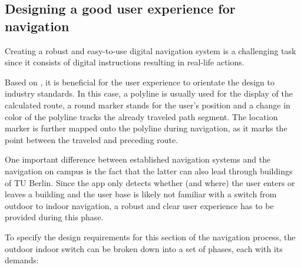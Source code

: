 \subsection{Designing a good user experience for navigation} \label{sub:navigation_user_experience}
Creating a robust and easy-to-use digital navigation system is a challenging task since it consists of digital instructions resulting in real-life actions.

Based on \cite{jakobs_law}, it is beneficial for the user experience to orientate the design to industry standards. In this case, a polyline is usually used for the display of the calculated route, a round marker stands for the user's position and a change in color of the polyline tracks the already traveled path segment. The location marker is further mapped onto the polyline during navigation, as it marks the point between the traveled and preceding route.

One important difference between established navigation systems and the navigation on campus is the fact that the latter can also lead through buildings of TU Berlin. Since the app only detects whether (and where) the user enters or leaves a building and the user base is likely not familiar with a switch from outdoor to indoor navigation, a robust and clear user experience has to be provided during this phase.

To specify the design requirements for this section of the navigation process, the outdoor indoor switch can be broken down into a set of phases, each with its demands:



